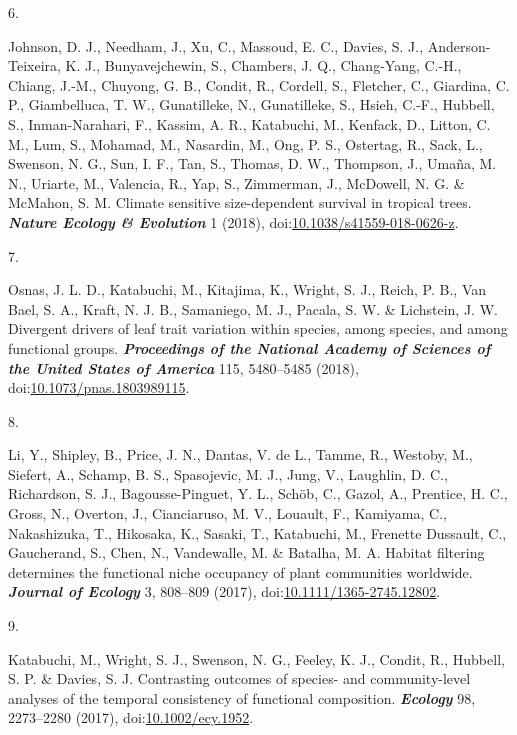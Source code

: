 \documentclass[
]{article}
\newlength{\cslhangindent}
\newlength{\csllabelwidth}
\newlength{\cslentryspacingunit} %
\newenvironment{CSLReferences}[2] %
 {%
  \setlength{\parindent}{0pt}
  \ifodd #1
  \let\oldpar\par
  \def\par{\hangindent=\cslhangindent\oldpar}
  \fi
  \setlength{\parskip}{#2\cslentryspacingunit}
 }%
 {}
\newcommand{\CSLLeftMargin}[1]{\parbox[t]{\csllabelwidth}{#1}}
\newcommand{\CSLRightInline}[1]{\parbox[t]{\linewidth - \csllabelwidth}{#1}\break}
\begin{document}
\begin{CSLReferences}{0}{0}
\leavevmode{}%
\CSLLeftMargin{6. }%
\CSLRightInline{Johnson, D. J., Needham, J., Xu, C., Massoud, E. C.,
Davies, S. J., Anderson-Teixeira, K. J., Bunyavejchewin, S., Chambers,
J. Q., Chang-Yang, C.-H., Chiang, J.-M., Chuyong, G. B., Condit, R.,
Cordell, S., Fletcher, C., Giardina, C. P., Giambelluca, T. W.,
Gunatilleke, N., Gunatilleke, S., Hsieh, C.-F., Hubbell, S.,
Inman-Narahari, F., Kassim, A. R., Katabuchi, M., Kenfack, D., Litton,
C. M., Lum, S., Mohamad, M., Nasardin, M., Ong, P. S., Ostertag, R.,
Sack, L., Swenson, N. G., Sun, I. F., Tan, S., Thomas, D. W., Thompson,
J., Umaña, M. N., Uriarte, M., Valencia, R., Yap, S., Zimmerman, J.,
McDowell, N. G. \& McMahon, S. M. Climate sensitive size-dependent
survival in tropical trees. \textbf{\emph{Nature Ecology \& Evolution}}
1 (2018),
doi:\href{https://doi.org/10.1038/s41559-018-0626-z}{10.1038/s41559-018-0626-z}.}

\leavevmode{}%
\CSLLeftMargin{7. }%
\CSLRightInline{Osnas, J. L. D., Katabuchi, M., Kitajima, K., Wright, S.
J., Reich, P. B., Van Bael, S. A., Kraft, N. J. B., Samaniego, M. J.,
Pacala, S. W. \& Lichstein, J. W. Divergent drivers of leaf trait
variation within species, among species, and among functional groups.
\textbf{\emph{Proceedings of the National Academy of Sciences of the
United States of America}} 115, 5480--5485 (2018),
doi:\href{https://doi.org/10.1073/pnas.1803989115}{10.1073/pnas.1803989115}.}

\leavevmode{}%
\CSLLeftMargin{8. }%
\CSLRightInline{Li, Y., Shipley, B., Price, J. N., Dantas, V. de L.,
Tamme, R., Westoby, M., Siefert, A., Schamp, B. S., Spasojevic, M. J.,
Jung, V., Laughlin, D. C., Richardson, S. J., Bagousse-Pinguet, Y. L.,
Schöb, C., Gazol, A., Prentice, H. C., Gross, N., Overton, J.,
Cianciaruso, M. V., Louault, F., Kamiyama, C., Nakashizuka, T.,
Hikosaka, K., Sasaki, T., Katabuchi, M., Frenette Dussault, C.,
Gaucherand, S., Chen, N., Vandewalle, M. \& Batalha, M. A. Habitat
filtering determines the functional niche occupancy of plant communities
worldwide. \textbf{\emph{Journal of Ecology}} 3, 808--809 (2017),
doi:\href{https://doi.org/10.1111/1365-2745.12802}{10.1111/1365-2745.12802}.}

\leavevmode{}%
\CSLLeftMargin{9. }%
\CSLRightInline{Katabuchi, M., Wright, S. J., Swenson, N. G., Feeley, K.
J., Condit, R., Hubbell, S. P. \& Davies, S. J. Contrasting outcomes of
species- and community-level analyses of the temporal consistency of
functional composition. \textbf{\emph{Ecology}} 98, 2273--2280 (2017),
doi:\href{https://doi.org/10.1002/ecy.1952}{10.1002/ecy.1952}.}


\end{CSLReferences}
\end{document}
